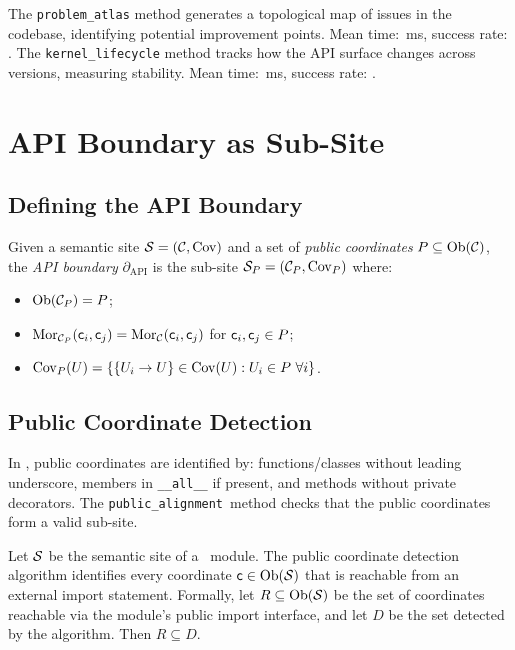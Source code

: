\documentclass[11pt]{article}
\newcommand{\PubAlign}{\texttt{public\_alignment}}
\newcommand{\APIBoundary}{\partial_{\mathrm{API}}}
\begin{document}
The \texttt{problem\_atlas} method generates a topological map of issues
in the codebase, identifying potential improvement points.  Mean time:
\compProfProblemAtlasMeanMs\,ms, success rate:
\compProfProblemAtlasRate.  The \texttt{kernel\_lifecycle} method tracks
how the API surface changes across versions, measuring stability.  Mean
time: \compProfKernelLifecycleMeanMs\,ms, success rate:
\compProfKernelLifecycleRate.

\section{API Boundary as Sub-Site}\label{sec:api-boundary}

\subsection{Defining the API Boundary}

\begin{definition}\label{def:api-boundary}
Given a semantic site $\mathcal{S} = (\mathcal{C}, \mathrm{Cov})$ and a set of
\emph{public coordinates} $P \subseteq \mathrm{Ob}(\mathcal{C})$, the \emph{API
boundary} $\APIBoundary$ is the sub-site $\mathcal{S}_P = (\mathcal{C}_P, \mathrm{Cov}_P)$
where:
\begin{itemize}[noitemsep]
  \item $\mathrm{Ob}(\mathcal{C}_P) = P$;
  \item $\mathrm{Mor}_{\mathcal{C}_P}(\mathsf{c}_i, \mathsf{c}_j) =
        \mathrm{Mor}_{\mathcal{C}}(\mathsf{c}_i, \mathsf{c}_j)$ for $\mathsf{c}_i, \mathsf{c}_j
        \in P$;
  \item $\mathrm{Cov}_P(U) = \{\{U_i \to U\} \in \mathrm{Cov}(U) : U_i \in P
        \ \forall i\}$.
\end{itemize}
\end{definition}

\subsection{Public Coordinate Detection}\label{sec:pub-detect}
In \Python, public coordinates are identified by: functions/classes without
leading underscore, members in \texttt{\_\_all\_\_} if present, and methods
without private decorators.  The \PubAlign\ method checks that the public
coordinates form a valid sub-site.

\begin{theorem}\label{thm:detect-complete}
Let $\mathcal{S}$ be the semantic site of a \Python\ module.  The public
coordinate detection algorithm identifies every coordinate $\mathsf{c} \in
\mathrm{Ob}(\mathcal{S})$ that is reachable from an external import statement.
Formally, let $R \subseteq \mathrm{Ob}(\mathcal{S})$ be the set of coordinates
reachable via the module's public import interface, and let $D$ be the
set detected by the algorithm.  Then $R \subseteq D$.
\end{theorem}
\end{document}
